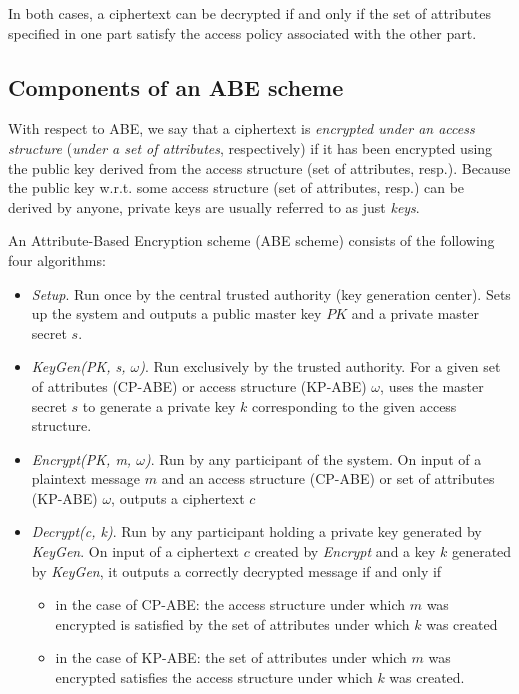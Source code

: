 In both cases, a ciphertext can be decrypted if and only if the set of attributes specified in one part satisfy the access policy associated with the other part.



\subsection{Components of an ABE scheme}

With respect to ABE, we say that a ciphertext is \emph{encrypted under an access structure} (\emph{under a set of attributes}, respectively) if it has been encrypted using the public key derived from the access structure (set of attributes, resp.).
Because the public key w.r.t. some access structure (set of attributes, resp.) can be derived by anyone, private keys are usually referred to as just \emph{keys}.

An Attribute-Based Encryption scheme (ABE scheme) consists of the following four algorithms: 
\begin{itemize}
    \item \emph{Setup}. Run once by the central trusted authority (key generation center). Sets up the system and outputs a public master key $PK$ and a private master secret $s$.
    \item \emph{KeyGen(PK, s, $\omega$)}. Run exclusively by the trusted authority. For a given set of attributes (CP-ABE) or access structure (KP-ABE) $\omega$, uses the master secret $s$ to generate a private key $k$ corresponding to the given access structure.
    \item \emph{Encrypt(PK, m, $\omega$)}. Run by any participant of the system. On input of a plaintext message $m$ and an access structure (CP-ABE) or set of attributes (KP-ABE) $\omega$, outputs a ciphertext $c$
    \item \emph{Decrypt(c, k)}. Run by any participant holding a private key generated by \emph{KeyGen}. On input of a ciphertext $c$ created by \emph{Encrypt} and a key $k$ generated by \emph{KeyGen}, it outputs a correctly decrypted message if and only if
    \begin{itemize}
        \item in the case of CP-ABE: the access structure under which $m$ was encrypted is satisfied by the set of attributes under which $k$ was created
        \item in the case of KP-ABE: the set of attributes under which $m$ was encrypted satisfies the access structure under which $k$ was created.
    \end{itemize}
\end{itemize}

